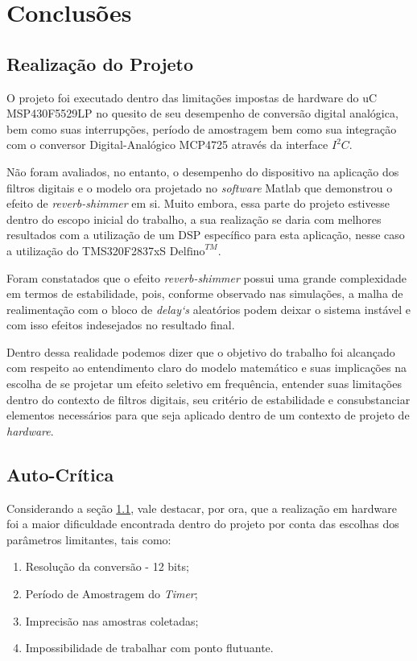 \chapter{Conclusões}

 			
	\section{Realização do Projeto}
	\label{realizacao-projeto}
		O projeto foi executado dentro das limitações impostas de hardware do uC MSP430F5529LP no quesito de seu desempenho de conversão digital analógica, bem como suas interrupções, período de amostragem bem como sua integração com o conversor Digital-Analógico MCP4725 através da interface $ I^2C $.
		
		Não foram avaliados, no entanto, o desempenho do dispositivo na aplicação dos filtros digitais e o modelo ora projetado no \textit{software} Matlab que demonstrou o efeito de \textit{reverb-shimmer} em si. Muito embora, essa parte do projeto estivesse dentro do escopo inicial do trabalho, a sua realização se daria com melhores resultados com a utilização de um DSP específico para esta aplicação, nesse caso a utilização do TMS320F2837xS $\text{Delfino}^{TM}$.
		
		Foram constatados que o efeito \textit{reverb-shimmer} possui uma grande complexidade em termos de estabilidade, pois, conforme observado nas simulações, a malha de realimentação com o bloco de \textit{delay`s} aleatórios podem deixar o sistema instável e com isso efeitos indesejados no resultado final.
		
		Dentro dessa realidade podemos dizer que o objetivo do trabalho foi alcançado com respeito ao entendimento claro do modelo matemático e suas implicações na escolha de se projetar um efeito seletivo em frequência, entender suas limitações dentro do contexto de filtros digitais, seu critério de estabilidade e consubstanciar elementos necessários para que seja aplicado dentro de um contexto de projeto de \textit{hardware}.
	
	\section{Auto-Crítica}
		Considerando a seção \ref{realizacao-projeto}, vale destacar, por ora, que a realização em hardware foi a maior dificuldade encontrada dentro do projeto por conta das escolhas dos parâmetros limitantes, tais como:
		
		\begin{enumerate}
			\item Resolução da conversão - 12 bits;
			\item Período de Amostragem do \textit{Timer};
			\item Imprecisão nas amostras coletadas;
			\item Impossibilidade de trabalhar com ponto flutuante.
		\end{enumerate}
		
